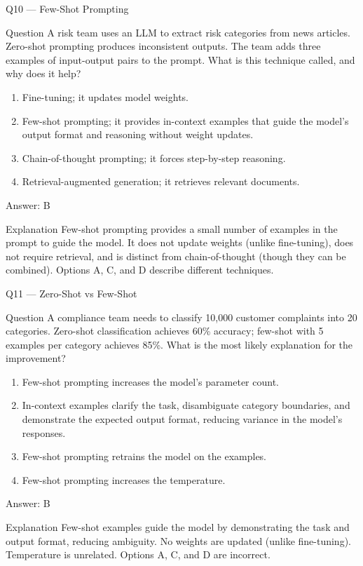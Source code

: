 \documentclass[aspectratio=169,8pt]{beamer}
\begin{document}
	\begin{frame}{Q10 --- Few-Shot Prompting}
		\begin{block}{Question}
			A risk team uses an LLM to extract risk categories from news articles. Zero-shot prompting produces inconsistent outputs. The team adds three examples of input-output pairs to the prompt. What is this technique called, and why does it help?
			\begin{enumerate}
				\item Fine-tuning; it updates model weights.
				\item Few-shot prompting; it provides in-context examples that guide the model's output format and reasoning without weight updates.
				\item Chain-of-thought prompting; it forces step-by-step reasoning.
				\item Retrieval-augmented generation; it retrieves relevant documents.
			\end{enumerate}
		\end{block}
		\begin{exampleblock}{Answer: B}\end{exampleblock}
		\begin{block}{Explanation}
			Few-shot prompting provides a small number of examples in the prompt to guide the model. It does not update weights (unlike fine-tuning), does not require retrieval, and is distinct from chain-of-thought (though they can be combined). Options A, C, and D describe different techniques.
		\end{block}
	\end{frame}
	
	\begin{frame}{Q11 --- Zero-Shot vs Few-Shot}
		\begin{block}{Question}
			A compliance team needs to classify 10,000 customer complaints into 20 categories. Zero-shot classification achieves 60\% accuracy; few-shot with 5 examples per category achieves 85\%. What is the most likely explanation for the improvement?
			\begin{enumerate}
				\item Few-shot prompting increases the model's parameter count.
				\item In-context examples clarify the task, disambiguate category boundaries, and demonstrate the expected output format, reducing variance in the model's responses.
				\item Few-shot prompting retrains the model on the examples.
				\item Few-shot prompting increases the temperature.
			\end{enumerate}
		\end{block}
		\begin{exampleblock}{Answer: B}\end{exampleblock}
		\begin{block}{Explanation}
			Few-shot examples guide the model by demonstrating the task and output format, reducing ambiguity. No weights are updated (unlike fine-tuning). Temperature is unrelated. Options A, C, and D are incorrect.
		\end{block}
	\end{frame}
	
\end{document}

